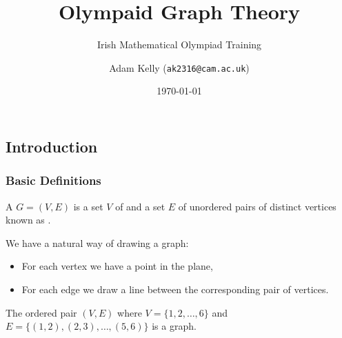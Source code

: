 \documentclass[11pt, mathserif]{beamer}
\title{Olympaid Graph Theory}
\subtitle{Irish Mathematical Olympiad Training}
\author{Adam Kelly (\texttt{ak2316@cam.ac.uk})}
\date{\today}
\theoremstyle{definition}
\theoremstyle{remark}
\begin{document}
\maketitle

\begin{frame}
  \section{Introduction}
\end{frame}

\begin{frame}
  \frametitle{Basic Definitions}

  \begin{definition}[Graph]
    A  $G = (V, E)$ is a set $V$ of  and a set $E$ of unordered pairs of distinct vertices known as .
  \end{definition}

  \vspace{1cm}

  We have a natural way of drawing a graph:
  \begin{itemize}
    \item For each vertex we have a point in the plane,
    \item For each edge we draw a line between the corresponding pair of vertices.
  \end{itemize}
  
  
  \begin{example}[Path]
    The ordered pair $(V, E)$ where $V = \{1, 2, \dots, 6\}$ and $E = \{ (1, 2), (2, 3), \dots, (5, 6)\}$ is a graph.
  \begin{center}
      
  
  
        \begin{tikzpicture}[x=0.75pt,y=0.75pt,yscale=-1,xscale=1]
  

\end{tikzpicture}
\end{center}
\end{example}
\end{frame}
\end{document}
